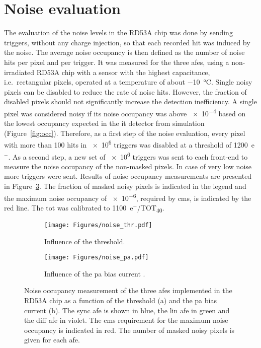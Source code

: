 
\section{Noise evaluation}
\label{sec:noise}

The evaluation of the noise levels in the RD53A chip was done by sending triggers, without any charge injection, so that each recorded hit was induced by the noise. The average noise occupancy is then defined as the number of noise hits per pixel and per trigger. It was measured for the three \gls{afe}s, using a non-irradiated RD53A chip with a sensor with the highest capacitance, i.e.~rectangular pixels, operated at a temperature of about \SI{-10}{\celsius}.
Single noisy pixels can be disabled to reduce the rate of noise hits. 
However, the fraction of disabled pixels should not significantly increase the detection inefficiency.
A single pixel was considered noisy if its noise occupancy was above \num{e-4} based on the lowest occupancy expected in the \gls{it} detector from simulation (Figure~\ref{fig:occ}). Therefore, as a first step of the noise evaluation, every pixel with more than \num{100} hits in \num{e6} triggers was disabled at a threshold of \num{1200}~e${^{-}}$. 
As a second step, a new set of \num{e6} triggers was sent to each front-end to measure the noise occupancy of the non-masked pixels. In case of very low noise more triggers were sent. Results of noise occupancy measurements are presented in Figure~\ref{fig:noise}. The fraction of masked noisy pixels is indicated in the legend and the maximum noise occupancy of \num{e-6}, required by \gls{cms}, is indicated by the red line. The \gls{tot} was calibrated to \num{1100}~e$^{-}$/TOT\textsubscript{40}.

\begin{figure}[t]
    \centering
    \begin{subfigure}{0.49\textwidth}
        \centering
        \texttt{[image: Figures/noise\_thr.pdf]}
        \caption{Influence of the threshold.}
        \label{fig:noise_thr}
    \end{subfigure}
    \hfill
    \begin{subfigure}{0.49\textwidth}
        \centering
        \texttt{[image: Figures/noise\_pa.pdf]}
        \caption{Influence of the \gls{pa} bias current \cite{luigi_vertex}.}
        \label{fig:noise_pabias}
    \end{subfigure}
    \caption{Noise occupancy measurement of the three \gls{afe}s implemented in the RD53A chip as a function of the threshold (a) and the \gls{pa} bias current (b). The \gls{sync} \gls{afe} is shown in blue, the \gls{lin} \gls{afe} in green and the \gls{diff} \gls{afe} in violet. The \gls{cms} requirement for the maximum noise occupancy is indicated in red. The number of masked noisy pixels is given for each \gls{afe}.}
    \label{fig:noise}
\end{figure}


